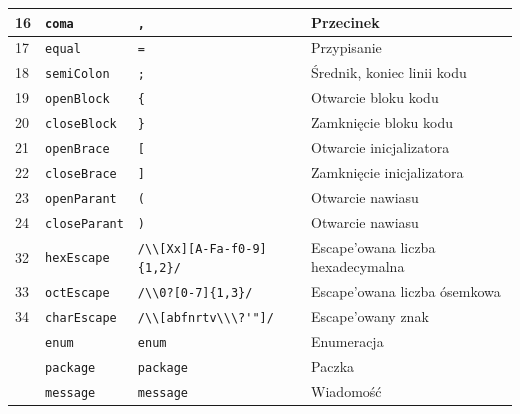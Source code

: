 \documentclass[a4paper]{article}
\begin{document}
\begin{center}
\begin{tabular}{| l | l | p{5cm} | p{5cm} |}
16   & \verb`coma`              & \verb`,`                &  Przecinek \\ \hline
17   & \verb`equal`             & \verb`=`                &  Przypisanie \\ \hline
18   & \verb`semiColon`         & \verb`;`                &  Średnik, koniec linii kodu \\ \hline
19   & \verb`openBlock`        & \verb`{`                &  Otwarcie bloku kodu \\ \hline
20   & \verb`closeBlock`       & \verb`}`                &  Zamknięcie bloku kodu \\ \hline
21   & \verb`openBrace`        & \verb`[`                &  Otwarcie inicjalizatora \\ \hline
22   & \verb`closeBrace`       & \verb`]`                &  Zamknięcie inicjalizatora \\ \hline
23   & \verb`openParant`       & \verb`(`                &  Otwarcie nawiasu \\ \hline
24   & \verb`closeParant`      & \verb`)`                &  Otwarcie nawiasu \\ \hline
32   & \verb`hexEscape`        & \verb`/\\[Xx][A-Fa-f0-9]{1,2}/` & Escape'owana liczba hexadecymalna \\ \hline
33   & \verb`octEscape`        & \verb`/\\0?[0-7]{1,3}/` & Escape'owana liczba ósemkowa \\ \hline
34   & \verb`charEscape`       & \verb`/\\[abfnrtv\\\?'"]/` & Escape'owany znak \\ \hline

  & \verb`enum` & \verb`enum` & Enumeracja \\ \hline
  & \verb`package` & \verb`package` & Paczka \\ \hline
  & \verb`message` & \verb`message` & Wiadomość \\ \hline
\end{tabular}
\end{center}

\newpage
\end{document}
